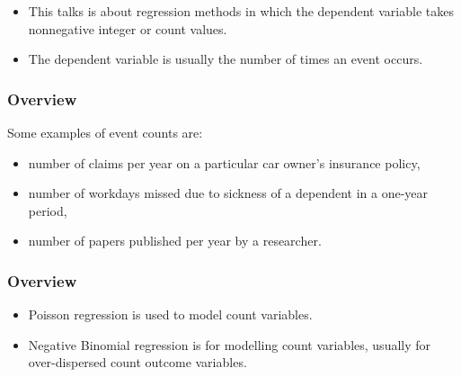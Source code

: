 \documentclass[MASTER.tex]{subfiles}
\begin{document}
\begin{frame}
	\Large
\begin{itemize}
\item This talks is about regression methods in which the dependent variable takes
nonnegative integer or count values. \item The dependent variable is usually the number of times an event occurs. 
\end{itemize}
\end{frame}
\begin{frame}
	\frametitle{Overview}
	\Large Some
examples of event counts are:
\begin{itemize}
\item number of claims per year on a particular car owner’s insurance policy,
\item number of workdays missed due to sickness of a dependent in a one-year period,
\item number of papers published per year by a researcher.
\end{itemize}
\end{frame}
\begin{frame}
\frametitle{Overview}
\Large
\begin{itemize}
\item  Poisson regression is used to model count variables.
\item  Negative Binomial regression is for modelling count variables, usually for over-dispersed count outcome variables.
\end{itemize}
\end{frame}
\end{document}
